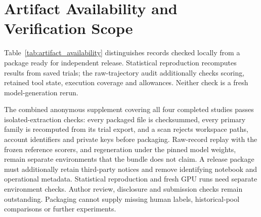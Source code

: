 \documentclass{article}
\begin{document}
\section{Artifact Availability and Verification Scope}
\label{app:availability}
Table~\ref{tab:artifact_availability} distinguishes records checked locally
from a package ready for independent release. Statistical reproduction
recomputes results from saved trials; the raw-trajectory audit additionally
checks scoring, retained tool state, execution coverage and allowances.
Neither check is a fresh model-generation rerun.

\begin{table}[h]
\centering
\caption{Verification and packaging status of the evidence used in this draft.
Retained records are not a claim that all artifacts have been anonymously
released. Replication counts here include the runtime component.}
\label{tab:artifact_availability}
\small

\end{table}

The combined anonymous supplement covering all four completed studies passes
isolated-extraction checks: every packaged file is checksummed, every primary
family is recomputed from its trial export, and a scan rejects workspace
paths, account identifiers and private keys before packaging. Raw-record
replay with the frozen reference scorers, and regeneration under the pinned
model weights, remain separate environments that the bundle does not claim.
A release package must additionally retain third-party notices and remove
identifying notebook and operational metadata. Statistical
reproduction and fresh GPU runs need separate environment checks. Author
review, disclosure and submission checks remain outstanding. Packaging cannot
supply missing human labels, historical-pool comparisons or further experiments.
\end{document}

